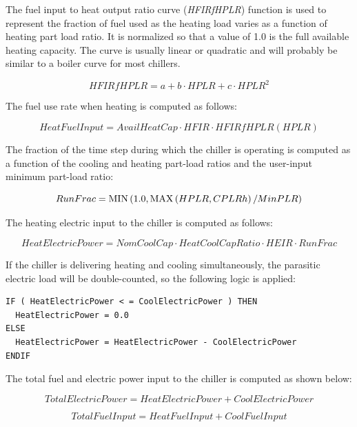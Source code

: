 The fuel input to heat output ratio curve (\emph{HFIRfHPLR}) function is used to represent the fraction of fuel used as the heating load varies as a function of heating part load ratio. It is normalized so that a value of 1.0 is the full available heating capacity. The curve is usually linear or quadratic and will probably be similar to a boiler curve for most chillers.

\begin{equation}
HFIRfHPLR = a + b \cdot HPLR + c \cdot HPL{R^2}
\end{equation}

The fuel use rate when heating is computed as follows:

\begin{equation}
HeatFuelInput = AvailHeatCap \cdot HFIR \cdot HFIRfHPLR(HPLR)
\end{equation}

The fraction of the time step during which the chiller is operating is computed as a function of the cooling and heating part-load ratios and the user-input minimum part-load ratio:

\begin{equation}
RunFrac = {\mathop{\rm MIN}\nolimits} \left( {1.0,{\mathop{\rm MAX}\nolimits} \left( {HPLR,CPLRh} \right)/MinPLR} \right)
\end{equation}

The heating electric input to the chiller is computed as follows:

\begin{equation}
HeatElectricPower = NomCoolCap \cdot HeatCoolCapRatio \cdot HEIR \cdot RunFrac
\end{equation}

If the chiller is delivering heating and cooling simultaneously, the parasitic electric load will be double-counted, so the following logic is applied:

\begin{lstlisting}
IF ( HeatElectricPower < = CoolElectricPower ) THEN
  HeatElectricPower = 0.0
ELSE
  HeatElectricPower = HeatElectricPower - CoolElectricPower
ENDIF
\end{lstlisting}

The total fuel and electric power input to the chiller is computed as shown below:

\begin{equation}
TotalElectricPower = HeatElectricPower + CoolElectricPower
\end{equation}

\begin{equation}
TotalFuelInput = HeatFuelInput + CoolFuelInput
\end{equation}

